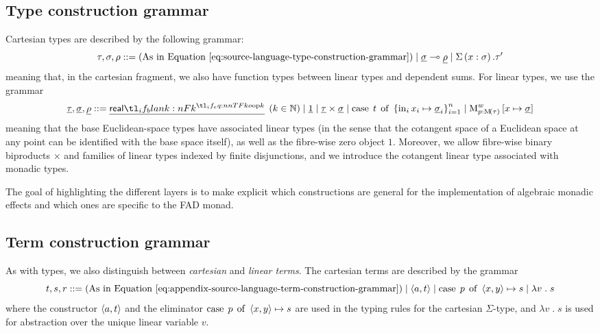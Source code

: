 \documentclass[11pt,a4paper]{article}
\theoremstyle{definition}
\theoremstyle{remark}
\providecommand{\N}{\mathbb{N}}
\providecommand{\lintype}[1]{\underline{#1}}
\providecommand{\linto}{\multimap}
\begin{document}
\subsection{Type construction grammar}

Cartesian types are described by the following grammar:
\begin{equation}
  \label{eq:appendix-target-language-cartesian-type-construction-grammar}
  \tau, \sigma, \rho
  ::=
  \left( \text{As in Equation~\eqref{eq:source-language-type-construction-grammar}} \right)
  \mid
  \lintype{\sigma} \linto \lintype{\rho}
  \mid
  \Sigma \left( x : \sigma \right) . \tau'
\end{equation}
meaning that, in the cartesian fragment, we also have function types between linear types and dependent sums. For linear types, we use the grammar
\begin{equation}
  \label{eq:appendix-target-language-linear-type-construction-grammar}
  \lintype{\tau}, \lintype{\sigma}, \lintype{\rho} ::=
  \lintype{\srcreal[k]}
  \; \left( k \in \N \right) 
  \mid
  \lintype{1}
  \mid
  \lintype{\tau} \times \lintype{\sigma}
  \mid
  \opn[b]{case} \; t \; \opn[b]{of} \; \left\{ \opn[b]{in}_{i} x_{i} \mapsto \lintype{\sigma}_{i} \right\}_{i = 1}^{n}
  \mid
  \opn[b]{M}^{w}_{p : \Fun[nn]{ \opn[b]{M} }{ \tau }}
  \left[ x \mapsto \lintype{ \sigma } \right]
\end{equation}
meaning that the base Euclidean-space types have associated linear types (in the sense that the cotangent space of a Euclidean space at any point can be identified with the base space itself), as well as the fibre-wise zero object \( 1 \). Moreover, we allow fibre-wise binary biproducts \( \times \) and families of linear types indexed by finite disjunctions, and we introduce the cotangent linear type associated with monadic types. 

The goal of highlighting the different layers is to make explicit which constructions are general for the implementation of algebraic monadic effects and which ones are specific to the FAD monad.

\subsection{Term construction grammar}

As with types, we also distinguish between \emph{cartesian} and \emph{linear terms}. The cartesian terms are described by the grammar
\begin{equation}
  \label{eq:appendix-target-language-cartesian-term-construction-grammar}
  t, s, r ::=
  \left( \text{As in Equation~\eqref{eq:appendix-source-language-term-construction-grammar}} \right) 
  \mid
  \tuple{ a, t }
  \mid
  \opn[b]{case} \; p \; \opn[b]{of} \; \tuple{ x, y } \mapsto s
  \mid
  \lambda v \; . \; s
\end{equation}
where the constructor \( \left\langle  a, t \right\rangle \) and the eliminator \( \opn[b]{case} \; p \; \opn[b]{of} \; \tuple{ x, y } \mapsto s \) are used in the typing rules for the cartesian \( \Sigma \)-type, and \( \lambda v \; . \; s \) is used for abstraction over the unique linear variable \( v \).
\end{document}
